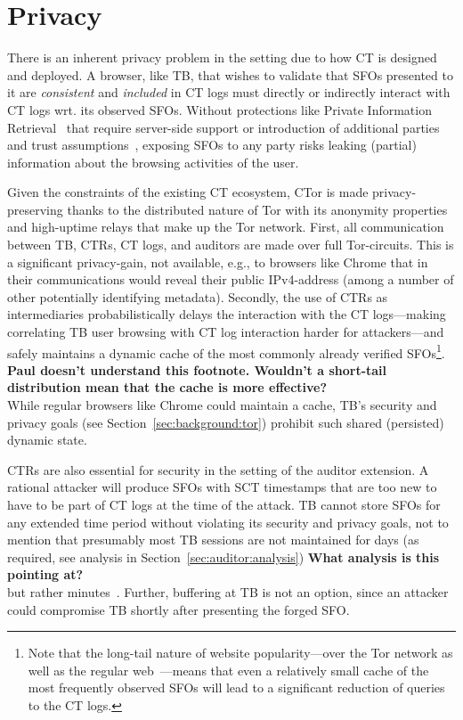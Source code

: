\section{Privacy} \label{sec:privacy}
There is an inherent privacy problem in the setting due to how CT is designed
and deployed. A browser, like TB, that wishes to validate that SFOs presented to
it are \emph{consistent} and \emph{included} in CT logs must directly or
indirectly interact with CT logs wrt. its observed SFOs. Without protections
like Private Information Retrieval~\cite{PIR} that require server-side support
or introduction of additional parties and trust
assumptions~\cite{lueks-and-goldberg,kales}, exposing SFOs to any party risks
leaking (partial) information about the browsing activities of the user.

Given the constraints of the existing CT ecosystem, CTor is made
privacy-preserving thanks to the distributed nature of Tor with its anonymity
properties and high-uptime relays that make up the Tor network. First, all
communication between TB, CTRs, CT logs, and auditors are made over full
Tor-circuits. This is a significant privacy-gain, not available, e.g., to
browsers like Chrome that in their communications would reveal their public
IPv4-address (among a number of other potentially identifying metadata).
Secondly, the use of CTRs as intermediaries probabilistically delays the
interaction with the CT logs---making correlating TB user browsing with CT log
interaction harder for attackers---and safely maintains a dynamic cache of the
most commonly already verified SFOs\footnote{Note that the long-tail nature of
website popularity---over the Tor network as well as the regular
web~\cite{mani}---means that even a relatively small cache of the most
frequently observed SFOs will lead to a significant reduction of queries to the
CT logs.}. {\bf \color{red} Paul doesn't understand this footnote. Wouldn't a short-tail distribution mean that the cache is more effective?}\\
While regular browsers like Chrome could maintain a cache, TB's
security and privacy goals (see Section~\ref{sec:background:tor}) 
prohibit such shared (persisted) dynamic state.

CTRs are also essential for security in the setting of the auditor extension. A
rational attacker will produce SFOs with SCT timestamps that are too new to have
to be part of CT logs at the time of the attack. TB cannot store SFOs for any
extended time period without violating its security and privacy goals, not to
mention that presumably most TB sessions are not maintained for
days (as required, see analysis in Section~\ref{sec:auditor:analysis}) 
{\bf \color{red} What analysis is this pointing at?}\\
but rather minutes~\cite{DBLP:conf/pam/AmannS16}. Further, buffering
at TB is not an option, since an attacker could compromise TB shortly
after presenting the forged SFO.

